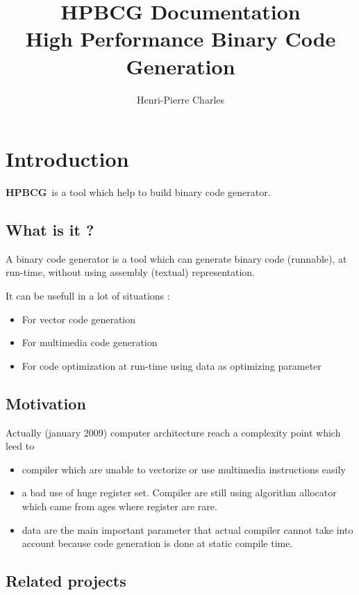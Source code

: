 \documentclass{article}
\title{HPBCG Documentation\\
High Performance Binary Code Generation}
\author{Henri-Pierre Charles}
\newcommand{\hpbcg}{\textbf{HPBCG}\ }
\begin{document}
\maketitle
\tableofcontents{}

\section{Introduction}

\hpbcg is a tool which help to build binary code generator.

\subsection{What is it ?}

A binary code generator is a tool which can generate binary code
(runnable), at run-time, without using assembly (textual)
representation.

It can be usefull in a lot of situations :
\begin{itemize}
\item For vector code generation
\item For multimedia code generation
\item For code optimization at run-time using data as optimizing parameter
\end{itemize}

\subsection{Motivation}

Actually (january 2009) computer architecture reach a complexity
point which leed to
\begin{itemize}
\item compiler which are unable to vectorize or use multimedia
  instructions easily
\item a bad use of huge register set. Compiler are still using
  algorithm allocator which came from ages where register are rare.
\item data are the main important parameter that actual compiler
  cannot take into account because code generation is done at static
  compile time.
\end{itemize}

\subsection{Related projects}
\end{document}
